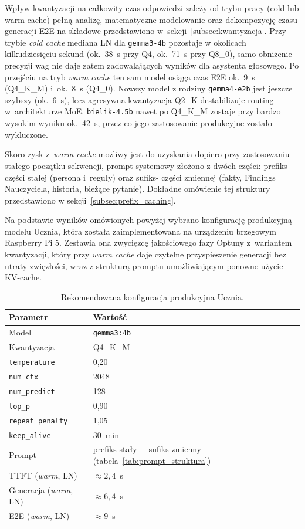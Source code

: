 Wpływ kwantyzacji na całkowity czas odpowiedzi zależy od trybu pracy (cold lub warm cache)
pełną analizę, matematyczne modelowanie oraz dekompozycję czasu generacji E2E na składowe przedstawiono
w~sekcji~\ref{subsec:kwantyzacja}. Przy trybie \emph{cold cache} mediana LN
dla \texttt{gemma3-4b} pozostaje w okolicach kilkudziesięciu sekund
(ok.~38~s przy Q4, ok.~71~s przy Q8\_0), samo obniżenie precyzji wag nie daje zatem
zadowalających wyników dla asystenta głosowego. Po przejściu
na tryb \emph{warm cache} ten sam model osiąga czas E2E ok.~9~s (Q4\_K\_M)
i~ok.~8~s (Q4\_0). Nowszy model z rodziny \texttt{gemma4-e2b} jest jeszcze szybszy (ok.~6~s),
lecz agresywna kwantyzacja Q2\_K destabilizuje routing w~architekturze
MoE. \texttt{bielik-4.5b} nawet po Q4\_K\_M zostaje przy bardzo wysokim wyniku ok.~42~s, przez co jego zastosowanie produkcyjne zostało wykluczone. 

Skoro zysk z~\emph{warm cache} możliwy jest do uzyskania dopiero przy zastosowaniu stałego początku
sekwencji, prompt systemowy złożono z dwóch części: prefiks- części stałej (persona i~reguły) oraz sufiks- części zmiennej (fakty, Findings Nauczyciela, historia, bieżące pytanie). Dokładne omówienie tej struktury przedstawiono w sekcji~\ref{subsec:prefix_caching}.


Na podstawie wyników omówionych powyżej wybrano konfigurację
produkcyjną modelu Ucznia, która została zaimplementowana na urządzeniu brzegowym Raspberry Pi 5.
Zestawia ona zwycięzcę jakościowego fazy Optuny z~wariantem kwantyzacji,
który przy \emph{warm cache} daje czytelne przyspieszenie generacji bez
utraty zwięzłości, wraz z strukturą promptu umożliwiającym ponowne użycie
KV-cache.

\begin{table}[H]
  \centering
  \caption{Rekomendowana konfiguracja produkcyjna Ucznia.}
  \label{tab:rekomendacja_produkcyjna}
  \small
  \begin{tabular}{ll}
    \hline
    Parametr & Wartość \\
    \hline
    Model              & \texttt{gemma3:4b} \\
    Kwantyzacja        & Q4\_K\_M \\
    \texttt{temperature}     & 0{,}20 \\
    \texttt{num\_ctx}        & 2048 \\
    \texttt{num\_predict}    & 128 \\
    \texttt{top\_p}          & 0{,}90 \\
    \texttt{repeat\_penalty} & 1{,}05 \\
    \texttt{keep\_alive}     & 30~min \\
    Prompt             & prefiks stały + sufiks zmienny
                         (tabela~\ref{tab:prompt_struktura}) \\
    TTFT (\emph{warm}, LN)       & $\approx 2{,}4$~s \\
    Generacja (\emph{warm}, LN)  & $\approx 6{,}4$~s \\
    E2E (\emph{warm}, LN)        & $\approx 9$~s \\
    \hline
  \end{tabular}
\end{table}

